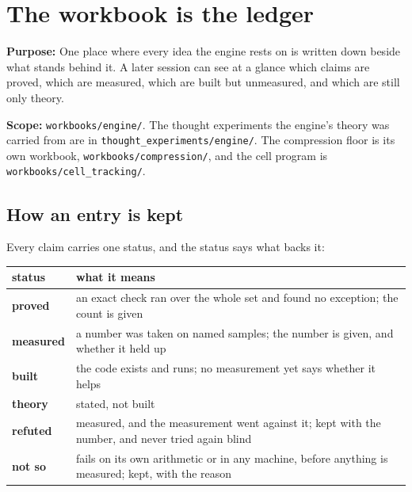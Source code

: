 \chapter{\texorpdfstring{The workbook is the ledger}{The workbook is the ledger}}
\label{chap:readme}

\textbf{Purpose:} One place where every idea the engine rests on is written down beside what stands behind it. A later session can see at a glance which claims are proved, which are measured, which are built but unmeasured, and which are still only theory.

\textbf{Scope:} \texttt{workbooks/\allowbreak{}engine/\allowbreak{}}. The thought experiments the engine's theory was carried from are in \texttt{thought\_\allowbreak{}experiments/\allowbreak{}engine/\allowbreak{}}. The compression floor is its own workbook, \texttt{workbooks/\allowbreak{}compression/\allowbreak{}}, and the cell program is \texttt{workbooks/\allowbreak{}cell\_\allowbreak{}tracking/\allowbreak{}}.

\section{\texorpdfstring{How an entry is kept}{How an entry is kept}}

Every claim carries one status, and the status says what backs it:

{\small
\setlength{\tabcolsep}{6pt}
\begin{longtable}{>{\RaggedRight\arraybackslash}p{}>{\RaggedRight\arraybackslash}p{}}
\toprule
status & what it means \\
\midrule
\endhead
\textbf{proved} & an exact check ran over the whole set and found no exception; the count is given \\
\textbf{measured} & a number was taken on named samples; the number is given, and whether it held up \\
\textbf{built} & the code exists and runs; no measurement yet says whether it helps \\
\textbf{theory} & stated, not built \\
\textbf{refuted} & measured, and the measurement went against it; kept with the number, and never tried again blind \\
\textbf{not so} & fails on its own arithmetic or in any machine, before anything is measured; kept, with the reason \\
\bottomrule
\end{longtable}
}

